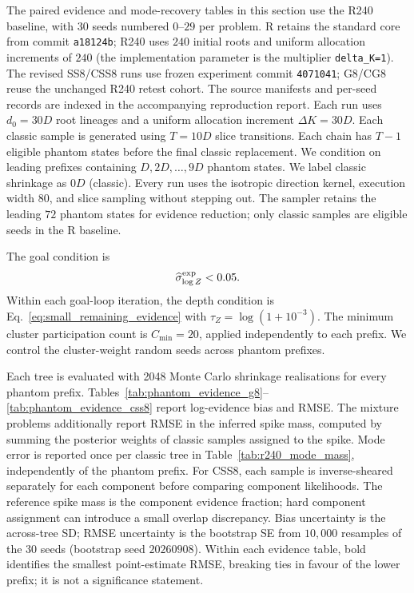 \documentclass[pdflatex,sn-basic,icol]{sn-jnl}
\theoremstyle{plain}
\theoremstyle{definition}
\begin{document}
The paired evidence and mode-recovery tables in this section use the R240 baseline, with 30 seeds numbered $0$--$29$ per problem.
R retains the standard core from commit \texttt{a18124b}; R240 uses $240$ initial roots and uniform allocation increments of $240$ (the implementation parameter is the multiplier \texttt{delta\_K=1}).
The revised SS8/CSS8 runs use frozen experiment commit \texttt{4071041}; G8/CG8 reuse the unchanged R240 retest cohort.
The source manifests and per-seed records are indexed in the accompanying reproduction report.
Each run uses $d_0=30D$ root lineages and a uniform allocation increment $\Delta K=30D$.
Each classic sample is generated using $T=10D$ slice transitions.
Each chain has $T-1$ eligible phantom states before the final classic replacement.
We condition on leading prefixes containing $D,2D,\ldots,9D$ phantom states.
We label classic shrinkage as $0D$ (classic).
Every run uses the isotropic direction kernel, execution width $80$, and slice sampling without stepping out.
The sampler retains the leading $72$ phantom states for evidence reduction; only classic samples are eligible seeds in the R baseline.

The goal condition is
\begin{align}
    \widehat\sigma^{\rm exp}_{\log Z}<0.05.
    \label{eq:benchmark_goal}
\end{align}
Within each goal-loop iteration, the depth condition is Eq.~\ref{eq:small_remaining_evidence} with $\tau_Z=\log(1+10^{-3})$.
The minimum cluster participation count is $C_{\min}=20$, applied independently to each prefix.
We control the cluster-weight random seeds across phantom prefixes.

Each tree is evaluated with 2048 Monte Carlo shrinkage realisations for every phantom prefix.
Tables~\ref{tab:phantom_evidence_g8}--\ref{tab:phantom_evidence_css8} report log-evidence bias and RMSE.
The mixture problems additionally report RMSE in the inferred spike mass, computed by summing the posterior weights of classic samples assigned to the spike.
Mode error is reported once per classic tree in Table~\ref{tab:r240_mode_mass}, independently of the phantom prefix.
For CSS8, each sample is inverse-sheared separately for each component before comparing component likelihoods.
The reference spike mass is the component evidence fraction; hard component assignment can introduce a small overlap discrepancy.
Bias uncertainty is the across-tree SD; RMSE uncertainty is the bootstrap SE from $10{,}000$ resamples of the 30 seeds (bootstrap seed $20260908$).
Within each evidence table, bold identifies the smallest point-estimate RMSE, breaking ties in favour of the lower prefix; it is not a significance statement.
\end{document}
